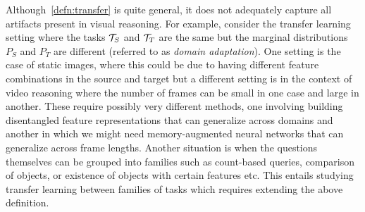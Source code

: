 Although~\cref{defn:transfer} is quite general, it does not adequately capture all artifacts present in visual reasoning.
For example, consider the transfer learning setting where the tasks $\mathcal{T}_S$ and $\mathcal{T}_T$ are the same 
but the marginal distributions $P_S$ and $P_T$ are different (referred to as \emph{domain adaptation}).
One setting is the case of static images, where this could be due to having different feature combinations in the source and
target but a different setting is in the context of video reasoning where the number of frames can be small in one case and 
large in another.
These require possibly very different methods, one involving building disentangled feature representations that can generalize across 
domains and another in which we might need memory-augmented neural networks that can generalize across frame lengths.
Another situation is when the questions themselves can be grouped into families such as count-based queries, 
comparison of objects, or existence of objects with certain features etc.
This entails studying transfer learning between families of tasks which requires extending the above definition.

